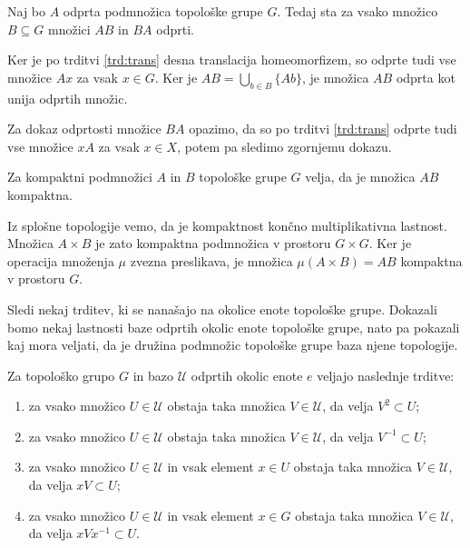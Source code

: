 \documentclass[mat1]{fmfdelo}
\newcommand{\Ucurl}{\mathcal{U}}
\begin{document}
\begin{trditev}\label{trd:prododp}
Naj bo $A$ odprta podmnožica topološke grupe $G$. Tedaj sta za vsako množico $B \subseteq G$ množici $AB$ in $BA$ odprti.
\end{trditev}

\begin{dokaz}
Ker je po trditvi \ref{trd:trans} desna translacija homeomorfizem, so odprte tudi vse množice $Ax$ za vsak $x \in G$. Ker je $AB = \bigcup_{b \in B}\lbrace Ab\rbrace$, je množica $AB$ odprta kot unija odprtih množic.

Za dokaz odprtosti množice $BA$ opazimo, da so po trditvi \ref{trd:trans} odprte tudi vse množice $xA$ za vsak $x \in X$, potem pa sledimo zgornjemu dokazu.
\end{dokaz}

\begin{trditev}\label{trd:prodkomp}
Za kompaktni podmnožici $A$ in $B$ topološke grupe $G$ velja, da je množica $AB$ kompaktna.
\end{trditev}

\begin{dokaz}
Iz splošne topologije vemo, da je kompaktnost končno multiplikativna lastnost. Množica $A \times B$ je zato kompaktna podmnožica v prostoru $G \times G$. Ker je operacija množenja $\mu$ zvezna preslikava, je množica $\mu (A \times B) = AB$ kompaktna v prostoru $G$.
\end{dokaz}

Sledi nekaj trditev, ki se nanašajo na okolice enote topološke grupe. Dokazali bomo nekaj lastnosti baze odprtih okolic enote topološke grupe, nato pa pokazali kaj mora veljati, da je družina podmnožic topološke grupe baza njene topologije.

\begin{trditev}\label{trd:okolice}
Za topološko grupo $G$ in bazo $\Ucurl$ odprtih okolic enote $e$ veljajo naslednje trditve:
\begin{enumerate}
\item za vsako množico $U \in \Ucurl$ obstaja taka množica $V \in \Ucurl$, da velja $V^{2} \subset U$;\label{last:oko1}
\item za vsako množico $U \in \Ucurl$ obstaja taka množica $V \in \Ucurl$, da velja $V^{-1} \subset U$;\label{last:oko2}
\item za vsako množico $U \in \Ucurl$ in vsak element $x \in U$ obstaja taka množica $V \in \Ucurl$, da velja $xV \subset U$; \label{last:oko3}
\item za vsako množico $U \in \Ucurl$ in vsak element $x \in G$ obstaja taka množica $V \in \Ucurl$, da velja $xVx^{-1} \subset U$.\label{last:oko4}
\end{enumerate}
\end{trditev}
\end{document}
